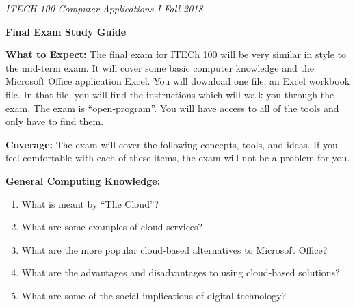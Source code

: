 \documentclass[a4paper, 11pt]{article}
\begin{document}
\noindent
\textit{ITECH 100} \hfill \textit{Computer Applications I} \hfill \textit{Fall 2018}
\begin{center}
\large\textbf{Final Exam Study Guide}
\end{center}

\large\textbf{What to Expect:}
The final exam for ITECh 100 will be very similar in style to the mid-term exam. It will cover some basic computer knowledge and the Microsoft Office application Excel. You will download one file, an Excel workbook file. In that file, you will find the instructions which will walk you through the exam. The exam is ``open-program''. You will have access to all of the tools and only have to find them.

\large\textbf{Coverage:}
The exam will cover the following concepts, tools, and ideas. If you feel comfortable with each of these items, the exam will not be a problem for you.

\large\textbf{General Computing Knowledge:}
\begin{enumerate}
    \item What is meant by ``The Cloud''?
    \item What are some examples of cloud services?
    \item What are the more popular cloud-based alternatives to Microsoft Office?
    \item What are the advantages and disadvantages to using cloud-based solutions?
    \item What are some of the social implications of digital technology?
\end{enumerate}
\end{document}
